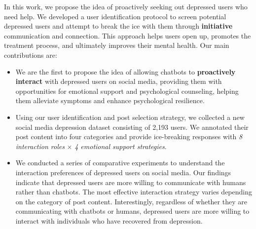 In this work, we propose the idea of proactively seeking out depressed users who need help. We developed a user identification protocol to screen potential depressed users and attempt to break the ice with them through \textbf{initiative} communication and connection. This approach helps users open up, promotes the treatment process, and ultimately improves their mental health.
Our main contributions are:
\begin{itemize}
    \item We are the first to propose the idea of allowing chatbots to \textbf{proactively interact} with depressed users on social media, providing them with opportunities for emotional support and psychological counseling, helping them alleviate symptoms and enhance psychological resilience.
    \item Using our user identification and post selection strategy, we collected a new social media depression dataset consisting of 2,193 users. We annotated their post content into four categories and provide ice-breaking responses with \textit{8 interaction roles} $\times$ \textit{4 emotional support strategies}.
     \item We conducted a series of comparative experiments to understand the interaction preferences of depressed users on social media. Our findings indicate that depressed users are more willing to communicate with humans rather than chatbots. The most effective interaction strategy varies depending on the category of post content. Interestingly, regardless of whether they are communicating with chatbots or humans, depressed users are more willing to interact with individuals who have recovered from depression. %
\end{itemize}